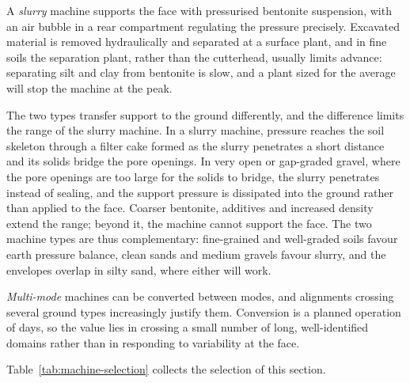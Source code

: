 A \emph{slurry} machine supports the face with pressurised bentonite
suspension, with an air bubble in a rear compartment regulating the pressure
precisely. Excavated material is removed hydraulically and separated at a
surface plant, and in fine soils the separation plant, rather than the
cutterhead, usually limits advance: separating silt and clay from bentonite
is slow, and a plant sized for the average will stop the machine at the peak.

The two types transfer support to the ground differently, and the difference
limits the range of the slurry machine. In a slurry machine, pressure reaches
the soil skeleton through a filter cake formed
as the slurry penetrates a short distance and its solids bridge the pore
openings. In very open or gap-graded gravel, where the pore openings are too
large for the solids to bridge, the slurry penetrates instead of sealing, and
the support pressure is dissipated into the ground rather than applied to the
face. Coarser bentonite, additives and increased density extend the range;
beyond it, the machine cannot support the face. The two machine types
are thus complementary: fine-grained and well-graded soils favour earth
pressure balance, clean sands and medium gravels favour slurry, and the
envelopes overlap in silty sand, where either will work.

\emph{Multi-mode} machines can be converted between modes, and alignments
crossing several ground types increasingly justify them. Conversion is a
planned operation of days, so the value lies in
crossing a small number of long, well-identified domains rather than in
responding to variability at the face.

Table~\ref{tab:machine-selection} collects the selection of this section.

